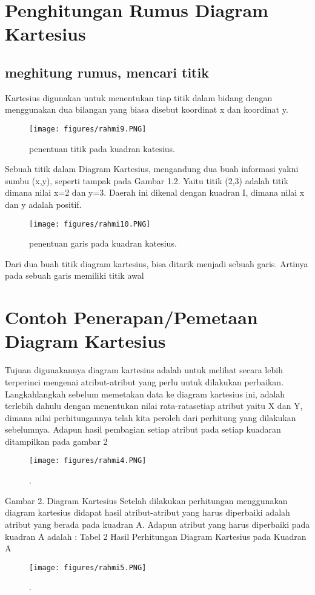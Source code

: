 \section{Penghitungan Rumus Diagram Kartesius}
\subsection{meghitung rumus, mencari titik}

Kartesius digunakan untuk menentukan tiap titik dalam bidang dengan menggunakan dua bilangan yang biasa disebut koordinat x dan koordinat y.
\begin{figure}[ht]
	\centerline{\texttt{[image: figures/rahmi9.PNG]}}
	\caption{penentuan titik pada kuadran katesius.}
	\label{rahmi9}
	\end{figure}

Sebuah titik dalam Diagram Kartesius, mengandung dua buah informasi yakni sumbu (x,y), seperti tampak pada Gambar 1.2. 
Yaitu titik (2,3) adalah titik dimana nilai x=2 dan y=3. Daerah ini dikenal dengan kuadran I, dimana nilai x dan y adalah positif.
\begin{figure}[ht]
	\centerline{\texttt{[image: figures/rahmi10.PNG]}}
	\caption{penentuan garis pada kuadran katesius.}
	\label{rahmi10}
	\end{figure}

Dari dua buah titik diagram kartesius, bisa ditarik menjadi sebuah garis. Artinya pada sebuah garis memiliki titik awal


\section{Contoh Penerapan/Pemetaan Diagram Kartesius}
Tujuan digunakannya diagram kartesius adalah untuk melihat secara lebih terperinci mengenai atribut-atribut yang perlu untuk dilakukan perbaikan. 
Langkahlangkah sebelum memetakan data ke diagram kartesius ini, adalah terlebih dahulu dengan menentukan nilai rata-ratasetiap atribut yaitu X dan Y, 
dimana nilai perhitungannya telah kita peroleh dari perhitung yang dilakukan sebelumnya.
Adapun hasil pembagian setiap atribut pada setiap kuadaran ditampilkan pada gambar 2
\begin{figure}[ht]
	\centerline{\texttt{[image: figures/rahmi4.PNG]}}
	\caption{.}
	\label{rahmi4}
	\end{figure}


Gambar 2. Diagram Kartesius
Setelah dilakukan perhitungan menggunakan diagram kartesius didapat hasil atribut-atribut yang harus diperbaiki adalah atribut yang berada pada kuadran A.
Adapun atribut yang harus diperbaiki pada kuadran A adalah :
Tabel 2 Hasil Perhitungan Diagram Kartesius pada Kuadran A	
\begin{figure}[ht]
	\centerline{\texttt{[image: figures/rahmi5.PNG]}}
	\caption{.}
	\label{rahmi5}
	\end{figure}


